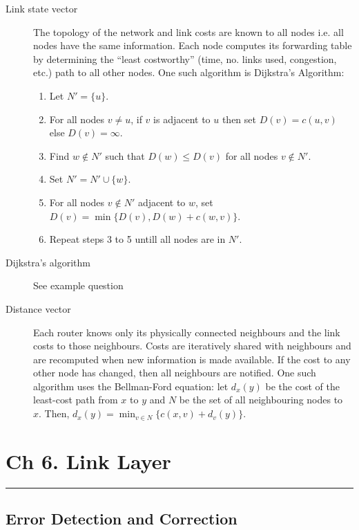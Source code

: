 \documentclass{article}
\begin{document}
\begin{description}
    \item[Link state vector] The topology of the network and link costs are known to all nodes i.e.
    all nodes have the same information. Each node computes its forwarding table by determining the
    ``least costworthy'' (time, no. links used, congestion, etc.) path to all other nodes. One such 
    algorithm is Dijkstra's Algorithm:
    \begin{enumerate}
        \item Let $N'=\{u\}$.
        \item For all nodes $v\neq u$, if $v$ is adjacent to $u$ then set $D(v)=c(u,v)$ else $D(v)=\infty$.
        \item Find $w\notin N'$ such that $D(w)\leq D(v)$ for all nodes $v\notin N'.$
        \item Set $N'=N'\cup\{w\}$.
        \item For all nodes $v\notin N'$ adjacent to $w$, set $D(v)=\min\{D(v), D(w)+c(w,v)\}$.
        \item Repeat steps 3 to 5 untill all nodes are in $N'$.
    \end{enumerate}
    
    \item[Dijkstra’s algorithm]
        See example question
    
    \item[Distance vector] Each router knows only its physically connected neighbours and the link
    costs to those neighbours. Costs are iteratively shared with neighbours and are recomputed when
    new information is made available. If the cost to any other node has changed, then all neighbours 
    are notified. One such algorithm uses the Bellman-Ford equation: let $d_x(y)$ be the cost of the
    least-cost path from $x$ to $y$ and $N$ be the set of all neighbouring nodes to $x.$ Then, 
    $d_x(y)=\min_{v\in N}\{c(x,v)+d_v(y)\}$.
\end{description}

\newpage

\section*{Ch 6. Link Layer}
\noindent
\rule{\linewidth}{0.5mm}
\noindent

\subsection*{Error Detection and Correction}
\end{document}
